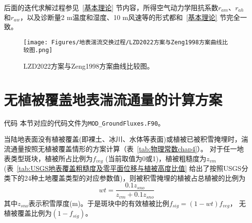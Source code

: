 后面的迭代求解过程参见~\ref{基本理论} 节内容，所得空气动力学阻抗系数$r_{am}$、$r_{ah}$和$r_{aw}$，以及诊断量2 m温度和湿度、10 m风速等的形式都和~\ref{基本理论} 节完全一致。
{
\begin{figure}[]
\centering
\texttt{[image: Figures/地表湍流交换过程/LZD2022方案与Zeng1998方案曲线比较图.png]}
\caption{LZD2022方案与Zeng1998方案曲线比较图。}
\label{fig:LZD2022方案与Zeng1998方案曲线比较图}
\end{figure}
}


\section{无植被覆盖地表湍流通量的计算方案}\label{无植被覆盖地表湍流通量的计算方案}
\begin{mymdframed}{代码}
本节对应的代码文件为\texttt{MOD\_GroundFluxes.F90}。
\end{mymdframed}

当陆地表面没有植被覆盖(即裸土、冰川、水体等表面)或植被已被积雪掩埋时，湍流通量按照无植被覆盖情形的方案计算（表~\ref{tab:物理常数chap4}）。
对于任一地表类型斑块，植被所占比例为$f_{veg}$ (当前取值为0或1)，植被粗糙度为$z_{vm}$
(表~\ref{tab:USGS地表覆盖粗糙度及零平面位移与植被高度比值} 给出了按照USGS分类下的24种土地覆盖类型的对应参数值)，则被积雪掩埋的植被占总植被的比例为
\begin{equation}
wt=\frac{0.1 z_{{sno}}}{z_{v m}+0.1 z_{{sno}}}
\end{equation}
其中$z_{sno}$表示积雪厚度(m)。于是斑块中的有效植被比例$f_{sig}=\left(1-wt\right)f_{veg}$，
无植被覆盖比例为$\left(1-f_{sig}\right)$。

